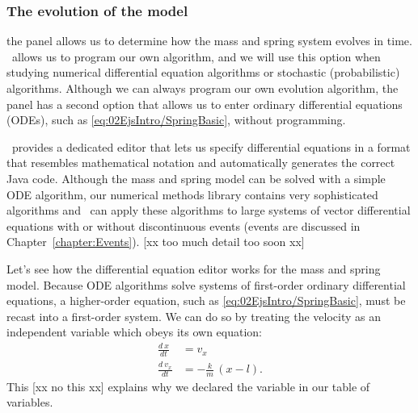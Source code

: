 \subsubsection{The evolution of the model}

the  panel allows us to determine how the mass and spring system evolves in time.  \ejs\ allows us to program our own algorithm, and we will use this option when studying
numerical differential equation algorithms or stochastic (probabilistic) algorithms. Although we can always program our
own evolution algorithm, the  panel has a second option that allows us to enter ordinary differential
equations (ODEs), such as \eqref{eq:02EjsIntro/SpringBasic}, without programming.

\ejs\ provides a dedicated editor that lets us specify differential equations in a format that resembles mathematical
notation and automatically generates the correct Java code. Although the mass and spring model
can be solved with a simple ODE algorithm, our numerical methods library contains very sophisticated algorithms and \ejs\ can apply these algorithms to large systems of vector differential equations with or without discontinuous events (events are discussed in Chapter~\ref{chapter:Events}). [xx too much detail too soon xx]

Let's see how the differential equation editor works for the mass and spring model. Because ODE algorithms solve
systems of first-order ordinary differential equations, a higher-order equation, such as
\eqref{eq:02EjsIntro/SpringBasic}, must be recast into a first-order system.   We can do so by treating the
velocity as an independent variable which obeys its own equation:
\begin{align}
  \frac{d\ x} {dt} &= v_x                  \label{eq:02EjsIntro/SpringBasicODE1} \\
  \frac{d\ v_x}{dt} &= -\frac{k}{m}\,(x-l). \label{eq:02EjsIntro/SpringBasicODE2}
\end{align}
This [xx no this xx] explains why we declared the  variable in our table of variables.

